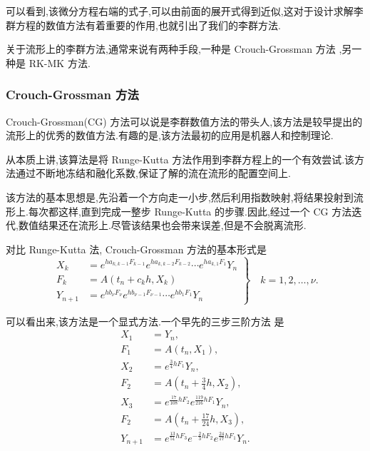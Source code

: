 可以看到,该微分方程右端的式子,可以由前面的展开式得到近似,这对于设计求解李群方程的数值方法有着重要的作用,也就引出了我们的李群方法.

关于流形上的李群方法,通常来说有两种手段,一种是 Crouch-Grossman 方法 \cite{crouch1993numerical,klein2013numerical,munthe2013onpost,sonneville2014geome,bras2011anonlinear,kroshko2011integrating} ,另一种是 RK-MK \cite{arieh2005liegroup} 方法.

\subsubsection{Crouch-Grossman 方法}
Crouch-Grossman(CG) 方法可以说是李群数值方法的带头人,该方法是较早提出的流形上的优秀的数值方法.有趣的是,该方法最初的应用是机器人和控制理论.

从本质上讲,该算法是将 Runge-Kutta 方法作用到李群方程上的一个有效尝试.该方法通过不断地冻结和融化系数,保证了解的流在流形的配置空间上.

该方法的基本思想是,先沿着一个方向走一小步,然后利用指数映射,将结果投射到流形上.每次都这样,直到完成一整步 Runge-Kutta 的步骤.因此,经过一个 CG 方法迭代,数值结果还在流形上.尽管该结果也会带来误差,但是不会脱离流形.

对比 Runge-Kutta 法, Crouch-Grossman 方法的基本形式是
\begin{equation*}
\left.\begin{aligned}
		X_k&=e^{ha_{k,k-1}F_{k-1}}e^{ha_{k,k-2}F_{k-2}}\cdots e^{ha_{k,1}F_{1}}Y_n\\
		F_k&=A(t_n+c_kh,X_k)\\
		Y_{n+1}&=e^{hb_{\nu}F_{\nu}}e^{hb_{\nu-1}F_{\nu-1}}\cdots e^{hb_{1}F_{1}}Y_n
	\end{aligned}\right\rbrace\quad k=1,2,\ldots,\nu.
\end{equation*}

可以看出来,该方法是一个显式方法.一个早先的三步三阶方法 \cite{crouch1993numerical} 是
\begin{equation*}
	\begin{aligned}
		X_1&=Y_n,\\
		F_1&=A(t_n,X_1),\\
		X_2&=e^{\frac{3}{4}hF_1}Y_n,\\
		F_2&=A(t_n+\frac{3}{4}h,X_2),\\
		X_3&=e^{\frac{17}{108}hF_2}e^{\frac{119}{216}hF_1}Y_n,\\
		F_2&=A(t_n+\frac{17}{24}h,X_3),\\
		Y_{n+1}&=e^{\frac{13}{51}hF_3}e^{-\frac{2}{3}hF_2}e^{\frac{24}{17}hF_1}Y_n.
	\end{aligned}
\end{equation*}

